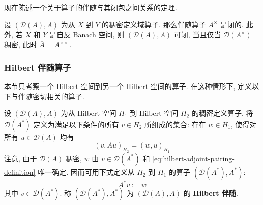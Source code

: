 现在陈述一个关于算子的伴随与其闭包之间关系的定理.

\begin{Theorem}
\label{thm:adjoint-closedness-and-double-adjoint-closure}
设 $(\mathcal{D}(A),A)$ 为从 $X$ 到 $Y$ 的稠密定义域算子. 那么伴随算子 $A^\times$ 是闭的. 此外, 若 $X$ 和 $Y$ 是自反 Banach 空间, 则 $(\mathcal{D}(A),A)$ 可闭, 当且仅当 $\mathcal{D}(A^\times)$ 稠密, 此时 $\overline A=A^{\times\times}$.
\end{Theorem}

\begingroup
{}
\renewcommand{\endProof}{\par\nobreak\hfill$\blacksquare$\par\vspace{0.1cm}}
\endgroup

\subsubsection{Hilbert 伴随算子}\label{subsec:hilbert-adjoint-operator}

本节只考察一个 Hilbert 空间到另一个 Hilbert 空间的算子. 在这种情形下, 定义以下与伴随密切相关的算子.

\begin{Definition}
\label{def:hilbert-adjoint-operator}
设 $(\mathcal{D}(A),A)$ 为从 Hilbert 空间 $H_1$ 到 Hilbert 空间 $H_2$ 的稠密定义算子. 将 $\mathcal{D}(A^*)$ 定义为满足以下条件的所有 $v\in H_2$ 所组成的集合: 存在 $w\in H_1$, 使得对所有 $u\in\mathcal{D}(A)$ 均有
\begin{equation}\label{eq:hilbert-adjoint-pairing-definition}
(v,Au)_{H_2}=(w,u)_{H_1}
\end{equation}
注意, 由于 $\mathcal{D}(A)$ 稠密, $w$ 由 $v\in\mathcal{D}(A^*)$ 和 \eqref{eq:hilbert-adjoint-pairing-definition} 唯一确定. 因而可用下式定义从 $H_2$ 到 $H_1$ 的算子 $(\mathcal{D}(A^*),A^*)$:
\begin{equation}\label{eq:hilbert-adjoint-action-definition}
A^*v:=w
\end{equation}
其中 $v\in\mathcal{D}(A^*)$. 称 $(\mathcal{D}(A^*),A^*)$ 为 $(\mathcal{D}(A),A)$ 的 \textbf{Hilbert 伴随}.
\end{Definition}

